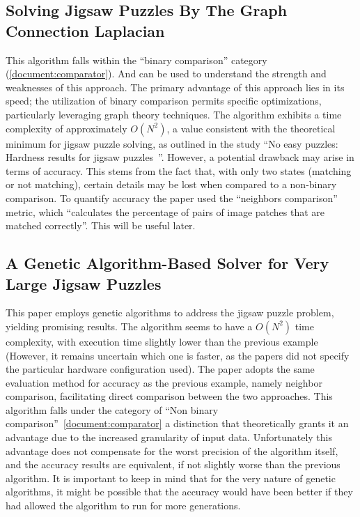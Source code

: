 \documentclass{article}
\begin{document}
\subsection{Solving Jigsaw Puzzles By The Graph Connection Laplacian~\cite{GCL}}
This algorithm falls within the ``binary comparison'' category (\cref{document:comparator}).
And can be used to understand the strength and weaknesses
of this approach.\newline
The primary advantage of this approach lies in its speed;
the utilization of binary comparison permits specific optimizations,
particularly leveraging graph theory techniques.\newline
The algorithm exhibits a time complexity of approximately \(O(N^2)\),
a value consistent with the theoretical minimum for
jigsaw puzzle solving, as outlined in the study
``No easy puzzles: Hardness results for jigsaw puzzles~\cite{ON2Claim}''.\newline
However, a potential drawback may arise in terms of accuracy.
This stems from the fact that, with only two states
(matching or not matching),
certain details may be lost when compared to a non-binary comparison. 
To quantify accuracy the paper used the ``neighbors comparison'' metric,
which ``calculates the percentage of pairs of image patches that are matched correctly''.
This will be useful later.\label{document:GCL}

\subsection{A Genetic Algorithm-Based Solver for Very Large Jigsaw Puzzles~\cite{GA}}
This paper employs genetic algorithms to address the
jigsaw puzzle problem, yielding promising results.\newline
The algorithm seems to have a \(O(N^2)\) time complexity,
with execution time slightly lower than the previous example
(However, it remains uncertain which one is faster, as the papers did not specify
the particular hardware configuration used).\newline
The paper adopts the same evaluation method for accuracy as the previous example,
namely neighbor comparison, facilitating direct comparison between the two approaches.
This algorithm falls under the category of “Non binary comparison”~\cref{document:comparator}
a distinction that theoretically grants it an advantage due to the increased granularity
of input data.
Unfortunately this advantage does not compensate for the worst precision
of the algorithm itself, and the accuracy results are equivalent,
if not slightly worse than the previous algorithm.\newline
It is important to keep in mind that for the very nature of genetic algorithms,
it might be possible that the accuracy would have been better if they had allowed
the algorithm to run for more generations.\label{document:GA}
\end{document}
